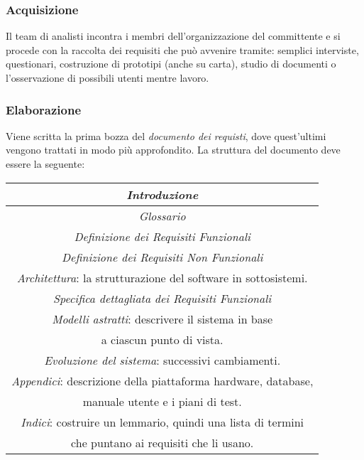 \subsubsection{Acquisizione}

Il team di analisti incontra i membri dell'organizzazione del committente e si procede con
la raccolta dei requisiti che può avvenire tramite: semplici interviste, questionari, costruzione di
prototipi (anche su carta), studio di documenti o l'osservazione di possibili utenti mentre lavoro.

\subsubsection{Elaborazione}

Viene scritta la prima bozza del \emph{documento dei requisti}, dove quest'ultimi vengono trattati in modo
più approfondito. La struttura del documento deve essere la seguente:

\begin{center}
    \begin{tabular}{||c||}
        \hline
        \emph{Introduzione} \\
        \hline
        \emph{Glossario} \\
        \hline
        \emph{Definizione dei Requisiti Funzionali} \\
        \hline
        \emph{Definizione dei Requisiti Non Funzionali} \\
        \hline
        \emph{Architettura}: la strutturazione del software in sottosistemi. \\
        \hline
        \emph{Specifica dettagliata dei Requisiti Funzionali} \\
        \hline
        \emph{Modelli astratti}: descrivere il sistema in base \\ a ciascun punto di vista. \\
        \hline
        \emph{Evoluzione del sistema}: successivi cambiamenti. \\
        \hline
        \emph{Appendici}: descrizione della piattaforma hardware, database, \\ manuale utente e i piani di test. \\
        \hline
        \emph{Indici}: costruire un lemmario, quindi una lista di termini \\ che puntano ai requisiti che li usano. \\
        \hline
    \end{tabular}
\end{center}

